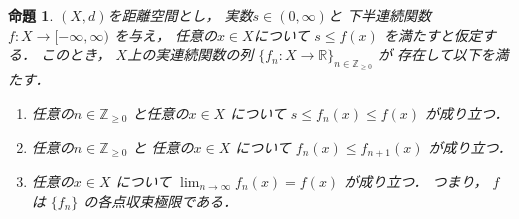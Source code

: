 \documentclass[leqno, a4paper, 12pt, dvipdfmx]{jsarticle}
\newtheorem{prop}[thm]{命題}
\newcommand{\zz}{\mathbb{Z}}
\newcommand{\rr}{\mathbb{R}}
\begin{document}
\begin{prop}\label{prop:approxconti}
$(X, d)$を距離空間とし，
実数$s\in (0, \infty)$と
下半連続関数$f\colon X\to [-\infty, \infty)$
を与え，
任意の$x\in X$について
$s\le f(x)$
を満たすと仮定する．
このとき，
$X$上の実連続関数の列
$\{f_{n}\colon X\to \rr\}_{n\in \zz_{\ge 0}}$
が
存在して以下を満たす．
\begin{enumerate}[label=\textup{(\arabic*)}]
\item 
任意の$n\in \zz_{\ge 0}$
と任意の$x\in X$
について
$s\le  f_{n}(x)\le f(x)$
が成り立つ．
\item 
任意の$n\in \zz_{\ge 0}$
と
任意の$x\in X$
について
$f_{n}(x)\le f_{n+1}(x)$
が成り立つ．
\item 
任意の$x\in X$
について
$\lim_{n\to \infty}f_{n}(x)=f(x)$
が成り立つ．
つまり，
$f$は
$\{f_{n}\}$
の各点収束極限である．
\end{enumerate}
\end{prop}
%
\end{document}
